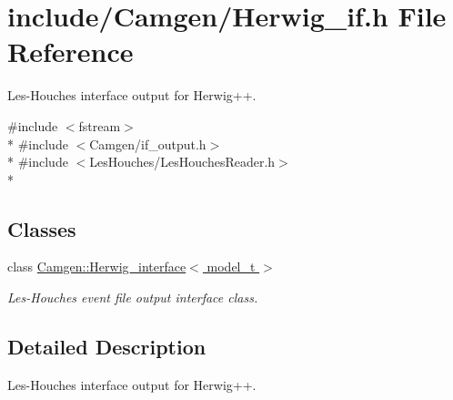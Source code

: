 \hypertarget{a00644}{\section{include/\-Camgen/\-Herwig\-\_\-if.h File Reference}
\label{a00644}
}


Les-\/\-Houches interface output for Herwig++.  


{\ttfamily \#include $<$fstream$>$}\\*
{\ttfamily \#include $<$Camgen/if\-\_\-output.\-h$>$}\\*
{\ttfamily \#include $<$Les\-Houches/\-Les\-Houches\-Reader.\-h$>$}\\*
\subsection*{Classes}
\begin{DoxyCompactItemize}
\item 
class \hyperlink{a00279}{Camgen\-::\-Herwig\-\_\-interface$<$ model\-\_\-t $>$}
\begin{DoxyCompactList}\small\item\em Les-\/\-Houches event file output interface class. \end{DoxyCompactList}\end{DoxyCompactItemize}


\subsection{Detailed Description}
Les-\/\-Houches interface output for Herwig++. 